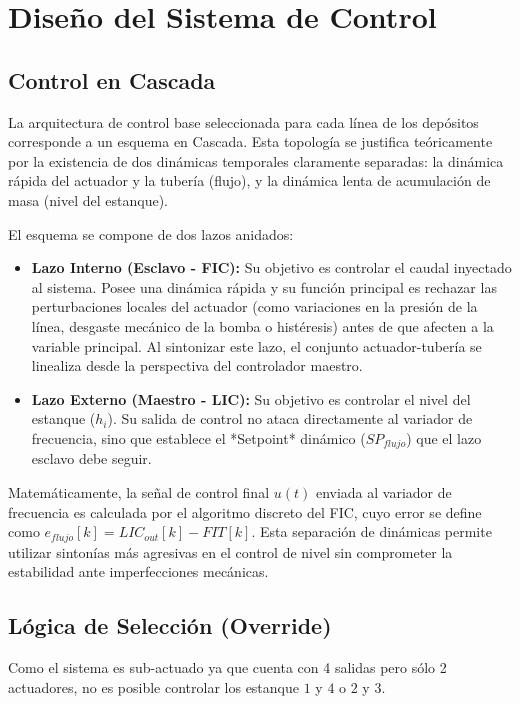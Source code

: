 \section{Diseño del Sistema de Control}

    \subsection{Control en Cascada} %

La arquitectura de control base seleccionada para cada línea de los depósitos corresponde a un esquema en Cascada. Esta topología se justifica teóricamente por la existencia de dos dinámicas temporales claramente separadas: la dinámica rápida del actuador y la tubería (flujo), y la dinámica lenta de acumulación de masa (nivel del estanque).

El esquema se compone de dos lazos anidados:
\begin{itemize}
    \item \textbf{Lazo Interno (Esclavo - FIC):} Su objetivo es controlar el caudal inyectado al sistema. Posee una dinámica rápida y su función principal es rechazar las perturbaciones locales del actuador (como variaciones en la presión de la línea, desgaste mecánico de la bomba o histéresis) antes de que afecten a la variable principal. Al sintonizar este lazo, el conjunto actuador-tubería se linealiza desde la perspectiva del controlador maestro.
    \item \textbf{Lazo Externo (Maestro - LIC):} Su objetivo es controlar el nivel del estanque ($h_i$). Su salida de control no ataca directamente al variador de frecuencia, sino que establece el *Setpoint* dinámico ($SP_{flujo}$) que el lazo esclavo debe seguir.
\end{itemize}

Matemáticamente, la señal de control final $u(t)$ enviada al variador de frecuencia es calculada por el algoritmo discreto del FIC, cuyo error se define como $e_{flujo}[k] = LIC_{out}[k] - FIT[k]$. Esta separación de dinámicas permite utilizar sintonías más agresivas en el control de nivel sin comprometer la estabilidad ante imperfecciones mecánicas.
    \subsection{Lógica de Selección (Override)} %
    Como el sistema es sub-actuado ya que cuenta con 4 salidas pero sólo 2 actuadores, no es posible controlar los estanque $1$ y $4$ o $2$ y $3$.

